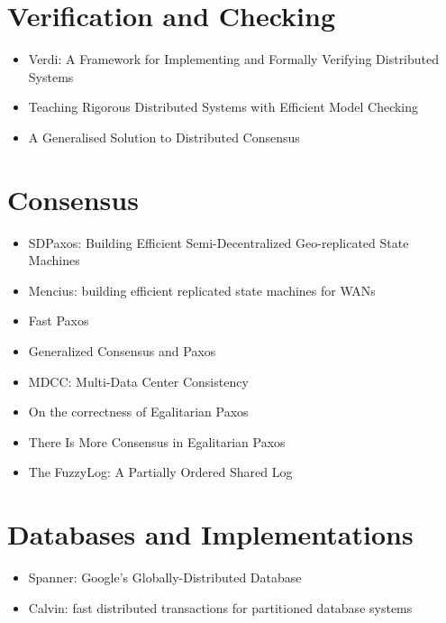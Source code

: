\documentclass{article}
\begin{document}
\section{Verification and Checking}

\begin{itemize}
	\item{Verdi: A Framework for Implementing and Formally Verifying Distributed Systems \cite{Verdi}}
	\item{Teaching Rigorous Distributed Systems with Efficient Model Checking \cite{MichaelWAET2019}}
	\item{A Generalised Solution to Distributed Consensus \cite{HowardGeneralized}}
\end{itemize}

\section{Consensus}

\begin{itemize}
	\item{SDPaxos: Building Efficient Semi-Decentralized Geo-replicated State Machines \cite{zhao2018sdpaxos}}
	\item{Mencius: building efficient replicated state machines for WANs \cite{Mencius}}
	\item{Fast Paxos \cite{lamport2006fast}}
	\item{Generalized Consensus and Paxos \cite{lamport2005generalized}}
	\item{MDCC: Multi-Data Center Consistency \cite{MDCC}}
	\item{On the correctness of Egalitarian Paxos \cite{SutraEPaxos}}
	\item{There Is More Consensus in Egalitarian Paxos \cite{EPaxos}}
	\item{The FuzzyLog: A Partially Ordered Shared Log \cite{FuzzyLog}}
\end{itemize}

\section{Databases and Implementations}

\begin{itemize}
	\item{Spanner: Google's Globally-Distributed Database \cite{Spanner}}
	\item{Calvin: fast distributed transactions for partitioned database systems \cite{Calvin}}
\end{itemize}



\end{document}
